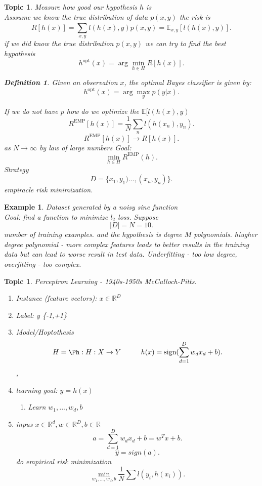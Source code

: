 \documentclass[a4paper,12pt]{scrartcl} %
\theoremstyle{darktheorem}
\newtheorem{topic}[theorem]{Topic}
\newtheorem{definition}[theorem]{Definition}
\newtheorem{example}[theorem]{Example}
\begin{document}
\begin{topic}
    Measure how good our hypothesis $h$ is\\
    Asssume we know the true distribution of data $p(x,y)$ the risk is
    \[
        R[h(x)] = \sum_{x,y}^{}l(h(x),y)p(x,y) = \mathbb{E}_{x,y}[l(h(x),y)]
    .\] 
    if we did know the true distribution $p(x,y)$ we can try to find the best hypothesis 
    \[
        h^{\text{opt}}(x) = \arg\min_{h\in H}R[h(x)]
    .\] 
    \begin{definition}
        Given an observation $x$, the optimal Bayes classifier is given by:
         \[
             h^{\text{opt}}(x) = \arg \max_{y}p(y|x)
        .\] 
    \end{definition}
    If we do not have $p$ how do we optimize the $ \mathbb{E}[l(h(x),y)$
    \[
        R^{\text{EMP}}[h(x)] = \frac{1}{N}\sum_{n}^{}l(h(x_n),y_n)
    .\] 
    \[
        R^{\text{EMP}}[h(x)] \rightarrow R[h(x)]
    .\] 
    as $N \rightarrow \infty$ by law of large numbers
    Goal:
    \[
        \min_{h \in H}R^{\text{EMP}}(h)
    .\]  
    Strategy
    \[
        D = \{x_1,y_1)...,(x_n,y_n)\}
    .\] 
    empiracle risk minimization. 
\end{topic}
\begin{example}
    Dataset generated by a noisy sine function\\
    Goal: find a function to minimize $l_2$ loss.
    Suppose
    \[
    |D| = N = 10
    .\] 
    number of training examples. and the hypothesis is degree $M$ polynomials.
    hiugher degree polynomial - more complex features leads to better results in the training data
    but can lead to worse result in test data. Underfitting - too low degree, overfitting - too complex.
\end{example}
\begin{topic}
    Perceptron Learning - 1940s-1950s McCulloch-Pitts.
    \begin{enumerate}
        \item Instance (feature vectors): $x \in \mathbb{R}^{D}$ 
        \item Label: y \in \{-1,+1\}
        \item Model/Hoptothesis
            \[
                H = \Ph:H : X \rightarrow Y \hspace{1cm} h(x) = \text{sign}(\sum_{d=1}^{D}w_dx_d +b)
            .\] , 
        \item learning goal: $y = h(x)$ 
            \begin{enumerate}
                \item Learn $w_1,...,w_d, b$
            \end{enumerate}
        \item inpus $x \in \mathbb{R}^{d}, w \in \mathbb{R}^{D}, b \in \mathbb{R}$
            \[
            a = \sum_{d=1}^{D}w_dx_d + b = w^{T}x +b
            .\] 
            \[
            \hat y = sign(a)
            .\] 
            do empirical risk minimization
            \[
                \min_{w_1,...,w_d,b} \frac{1}{N}\sum_{}^{}l(y_i,h(x_i))
            .\] 
    \end{enumerate}
\end{topic}
\end{document}
